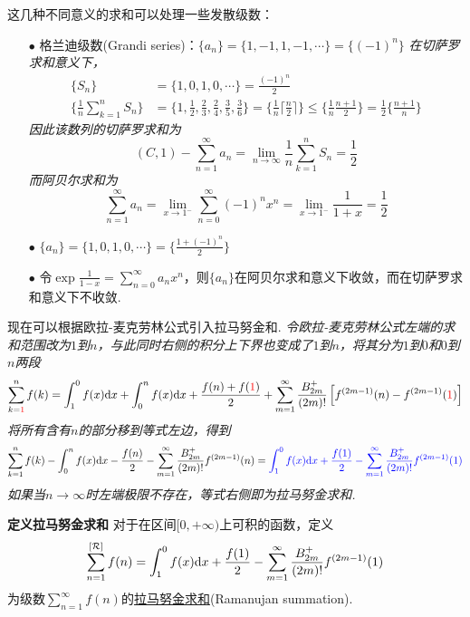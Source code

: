 \documentclass[UTF8]{ctexart}
\newcommand{\trm}[1]{{\rm #1}}
\newenvironment{definition}[1]
    {\begin{tcolorbox}[enhanced, colback=LightYellow, breakable=false, frame hidden, borderline west={1.5mm}{-2mm}{DarkGreen}]
    {\bfseries {\color{DarkGreen} 定义}\quad #1} \newline}
    {\end{tcolorbox}}
\begin{document}
这几种不同意义的求和可以处理一些发散级数：
\begin{itemize}
    \item [\(\bullet\)] 格兰迪级数(Grandi series)：\(\{a_n\} = \{1,-1,1,-1,\cdots\} = \{(-1)^n\}\)
    \textit{在切萨罗求和意义下，}
    \begin{align*}
        \{S_n\} &= \{1,0,1,0,\cdots\} = \frac{(-1)^n}{2} \\
        \{\frac{1}{n}\sum_{k=1}^nS_n\} &= \{1, \frac{1}{2}, \frac{2}{3}, \frac{2}{4}, \frac{3}{5}, \frac{3}{6}\} = \{\frac{1}{n}\lceil \frac{n}{2} \rceil\} \leq \{\frac{1}{n}\frac{n+1}{2}\} = \frac{1}{2}\{\frac{n+1}{n}\}
    \end{align*}
    \textit{因此该数列的切萨罗求和为}
    \[(C,1)-\sum_{n=1}^{\infty}a_n = \lim_{n \to \infty} \frac{1}{n}\sum_{k=1}^nS_n = \frac{1}{2}\]
    \textit{而阿贝尔求和为}
    \[\sum_{n=1}^{\infty}a_n = \lim_{x \to 1^-}\sum_{n=0}^{\infty}(-1)^nx^n = \lim_{x \to 1^-} \frac{1}{1+x} = \frac{1}{2}\]
    \item [\(\bullet\)] \(\displaystyle{\{a_n\} = \{1,0,1,0,\cdots\} = \{\frac{1+(-1)^n}{2}\}}\)
    \item [\(\bullet\)] 令\(\displaystyle{\exp\frac{1}{1-x} = \sum_{n=0}^{\infty} a_nx^n}\)，则\(\{a_n\}\)在阿贝尔求和意义下收敛，而在切萨罗求和意义下不收敛.
\end{itemize}

现在可以根据欧拉-麦克劳林公式引入拉马努金和.
\newline
\textit{
    令欧拉-麦克劳林公式左端的求和范围改为\(1\)到\(n\)，与此同时右侧的积分上下界也变成了\(1\)到\(n\)，将其分为\(1\)到\(0\)和\(0\)到\(n\)两段
}
\[\sum_{k={\color{red}1}}^{n}f(k) = \int_1^0f(x)\trm{d}x + \int_0^nf(x)\trm{d}x + \frac{f(n)+f({\color{red}1})}{2} + \sum_{m=1}^{\infty}\frac{B_{2m}^+}{(2m)!}\left[f^{(2m-1)}(n) - f^{(2m-1)}({\color{red}1})\right]\]
\textit{
    将所有含有\(n\)的部分移到等式左边，得到
}
\[\sum_{k=1}^{n}f(k) - \int_{0}^nf(x)\trm{d}x  - \frac{f(n)}{2}  - \sum_{m=1}^{\infty}\frac{B_{2m}^+}{(2m)!}f^{(2m-1)}(n) = {\color{blue}\int_1^0f(x)\trm{d}x + \frac{f(1)}{2} - \sum_{m=1}^{\infty}\frac{B_{2m}^+}{(2m)!}f^{(2m-1)}(1)}\]
\textit{如果当\(n\to\infty\)时左端极限不存在，等式右侧即为拉马努金求和.}
\begin{definition}{拉马努金求和}
    对于在区间\([0,+\infty)\)上可积的函数，定义
    \[\sum_{n=1}^{[\mathcal{R}]}f(n) = \int_1^0f(x)\trm{d}x + \frac{f(1)}{2} - \sum_{m=1}^{\infty}\frac{B_{2m}^+}{(2m)!}f^{(2m-1)}(1)\]
    为级数\(\displaystyle{\sum_{n=1}^{\infty}f(n)}\)的\uline{拉马努金求和}(Ramanujan summation).
\end{definition}
\end{document}
